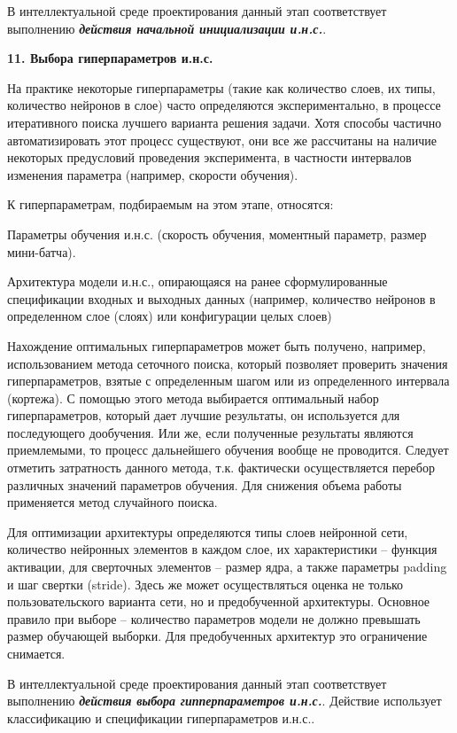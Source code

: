 В интеллектуальной среде проектирования данный этап соответствует выполнению \textbf{\textit{действия начальной инициализации и.н.с.}}.


\textbf{11. Выбора гиперпараметров и.н.с.}

На практике некоторые гиперпараметры (такие как количество слоев, их типы, количество нейронов в слое) часто определяются экспериментально, в процессе итеративного поиска лучшего варианта решения задачи. Хотя способы частично автоматизировать этот процесс существуют, они все же рассчитаны на наличие некоторых предусловий проведения эксперимента, в частности интервалов изменения параметра (например, скорости обучения).

К гиперпараметрам, подбираемым на этом этапе, относятся:
\begin{textitemize}
	\item Параметры обучения и.н.с. (скорость обучения, моментный параметр, размер мини-батча).
	\item Архитектура модели и.н.с., опирающаяся на ранее сформулированные спецификации входных и выходных данных (например, количество нейронов в определенном слое (слоях) или конфигурации целых слоев)
\end{textitemize}

Нахождение оптимальных гиперпараметров может быть получено, например, использованием метода сеточного поиска, который позволяет проверить значения гиперпараметров, взятые с определенным шагом или из определенного интервала (кортежа). С помощью этого метода выбирается оптимальный набор гиперпараметров, который дает лучшие результаты, он используется для последующего дообучения. Или же, если полученные результаты являются приемлемыми, то процесс дальнейшего обучения вообще не проводится. Следует отметить затратность данного метода, т.к. фактически осуществляется перебор различных значений параметров обучения. Для снижения объема работы применяется метод случайного поиска.

Для оптимизации архитектуры определяются типы слоев нейронной сети, количество нейронных элементов в каждом слое, их характеристики -- функция активации, для сверточных элементов -- размер ядра, а также параметры padding и шаг свертки (stride).
Здесь же может осуществляться оценка не только пользовательского варианта сети, но и предобученной архитектуры. Основное правило при выборе -- количество параметров модели не должно превышать размер обучающей выборки. Для предобученных архитектур это ограничение снимается.

В интеллектуальной среде проектирования данный этап соответствует выполнению \textbf{\textit{действия выбора гипперпараметров и.н.с.}}. Действие использует классификацию и спецификации гиперпараметров и.н.с..


